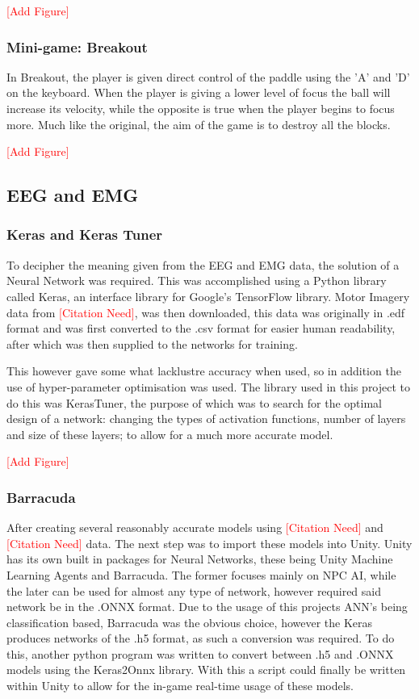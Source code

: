 \documentclass[11pt, a4paper]{article}
\newcommand{\addfigure}
{\hfill 

\textcolor{red}{[Add Figure]}

\hfill}
\newcommand{\addcitation}{\textcolor{red}{[Citation Need]}}
\begin{document}
\addfigure %

\subsubsection{Mini-game: Breakout}
In Breakout, the player is given direct control of the paddle using the 'A' and 'D' on the keyboard. When the player is giving a lower level of focus the ball will increase its velocity, while the opposite is true when the player begins to focus more. Much like the original, the aim of the game is to destroy all the blocks.

\addfigure %

\pagebreak
\subsection{EEG and EMG }
\subsubsection{Keras and Keras Tuner}
To decipher the meaning given from the EEG and EMG data, the solution of a Neural Network was required. This was accomplished using a Python library called Keras, an interface library for Google's TensorFlow library. Motor Imagery data from \addcitation{}, was then downloaded, this data was originally in .edf format and was first converted to the .csv format for easier human readability, after which was then supplied to the networks for training. 

\hfill

This however gave some what lacklustre accuracy when used, so in addition the use of hyper-parameter optimisation was used. The library used in this project to do this was KerasTuner, the purpose of which was to search for the optimal design of a network: changing the types of activation functions, number of layers and size of these layers; to allow for a much more accurate model.

\addfigure %

\subsubsection{Barracuda}
After creating several reasonably accurate models using \addcitation{} and \addcitation{} data. The next step was to import these models into Unity. Unity has its own built in packages for Neural Networks, these being Unity Machine Learning Agents and Barracuda. The former focuses mainly on NPC AI, while the later can be used for almost any type of network, however required said network be in the .ONNX format. Due to the usage of this projects ANN's being classification based, Barracuda was the obvious choice, however the Keras produces networks of the .h5 format, as such a conversion was required. To do this, another python program was written to convert between .h5 and .ONNX models using the Keras2Onnx library. With this a script could finally be written within Unity to allow for the in-game real-time usage of these models.
\end{document}
